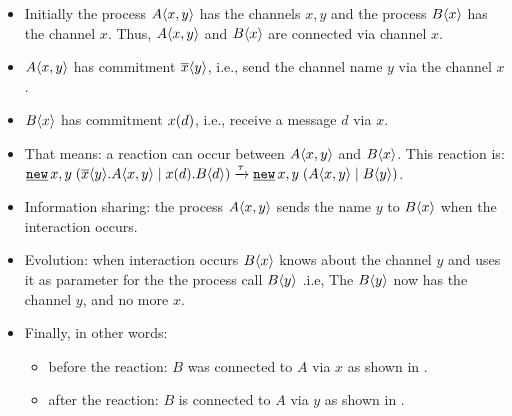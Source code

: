 \begin{itemize}
\item Initially the process $A\langle x,y\rangle$ has the channels $x,y$ and the process $B\langle x\rangle$ has the channel $x$. Thus, $A\langle x,y\rangle$ and $B\langle x\rangle$ are connected via channel $x$.
\item $A\langle x,y\rangle$ has commitment $\overline{x}\langle{y}\rangle$, i.e., send the channel name $y$ via the channel $x$.
\item $B\langle x\rangle$ has commitment $x({d})$, i.e., receive a message $d$ via $x$.
\item That means: a reaction can occur between $A\langle x,y\rangle$ and $B\langle x\rangle$. This reaction is: $\procres{x,y}{(\procpar{\out{x}{{y}}.\proccall{A}{x,y}}{\inp{x}{{d}}.\proccall{B}{d}})} \transs{\tau} \procres{x,y}{(\procpar{\proccall{A}{x,y}}{\proccall{B}{y}})}$.
\item Information sharing: the process $A\langle x,y\rangle$ sends the name $y$ to $B\langle x\rangle$ when the interaction occurs.
\item Evolution: when interaction occurs $B\langle x\rangle$ knows about the channel $y$ and uses it as parameter for the the process call $B\langle y\rangle$ .i.e, The  $B\langle y\rangle$ now has the channel $y$, and no more $x$.
\item Finally, in other words: 
\begin{itemize}
\item before the reaction: $B$ was connected to $A$ via $x$ as shown in .
\item after the reaction: $B$ is connected to $A$ via $y$ as shown in .
\end{itemize}
\end{itemize}
